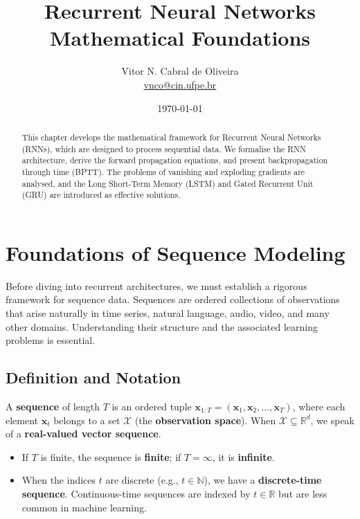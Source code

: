 \documentclass{tufte-handout}
\title{Recurrent Neural Networks \\ Mathematical Foundations}
\author{Vitor N. Cabral de Oliveira\\ \href{mailto:vnco@cin.ufpe.br}{vnco@cin.ufpe.br}}
\date{\today}
\begin{document}
\maketitle

\begin{abstract}
    This chapter develops the mathematical framework for Recurrent Neural Networks (RNNs), which are designed to process sequential data. We formalise the RNN architecture, derive the forward propagation equations, and present backpropagation through time (BPTT). The problems of vanishing and exploding gradients are analysed, and the Long Short-Term Memory (LSTM) and Gated Recurrent Unit (GRU) are introduced as effective solutions.
\end{abstract}

\newpage
\hypersetup{linkcolor=wp-text}
\tableofcontents
\hypersetup{linkcolor=wp-primary}
\newpage

\section{Foundations of Sequence Modeling}

Before diving into recurrent architectures, we must establish a rigorous framework for sequence data. Sequences are ordered collections of observations that arise naturally in time series, natural language, audio, video, and many other domains. Understanding their structure and the associated learning problems is essential.

\subsection{Definition and Notation}

\begin{defn}[Sequence]
    A \textbf{sequence} of length $T$ is an ordered tuple $\mathbf{x}_{1:T} = (\mathbf{x}_1, \mathbf{x}_2, \dots, \mathbf{x}_T)$, where each element $\mathbf{x}_t$ belongs to a set $\mathcal{X}$ (the \textbf{observation space}). When $\mathcal{X} \subseteq \mathbb{R}^d$, we speak of a \textbf{real-valued vector sequence}. 
    \begin{itemize}
        \item If $T$ is finite, the sequence is \textbf{finite}; if $T = \infty$, it is \textbf{infinite}.
        \item When the indices $t$ are discrete (e.g., $t \in \mathbb{N}$), we have a \textbf{discrete-time sequence}. Continuous-time sequences are indexed by $t \in \mathbb{R}$ but are less common in machine learning.
    \end{itemize}
\end{defn}
\end{document}
